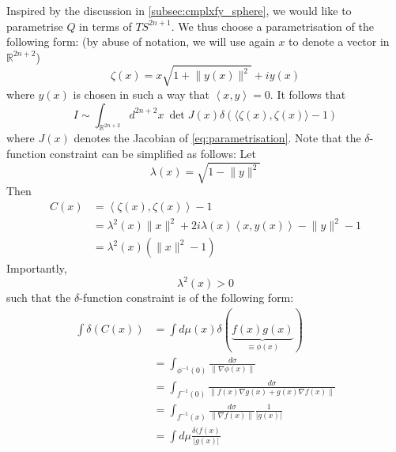 \documentclass[a4paper,11pt]{article}
\theoremstyle{definition}
\newcommand{\RR}{\mathbb{R}}
\begin{document}
Inspired by the discussion in \ref{subsec:cmplxfy_sphere}, we would like to parametrise $Q$ in terms of $TS^{2n + 1}$.
We thus choose a parametrisation of the following form: (by abuse of notation, we will use again $x$ to denote a vector in $\RR^{2n + 2}$)
\begin{equation}
  \zeta(x) = x \sqrt{1 + \lVert y(x) \rVert^2} + i y(x)
  \label{eq:parametrisation}
\end{equation}
where $y(x)$ is chosen in such a way that $\left\langle x,y \right\rangle = 0$.
It follows that 
\begin{equation}
  I \sim \int_{\RR^{2n + 2}} d^{2n + 2}x\ \det J(x) \delta(\langle \zeta(x), \zeta(x) \rangle - 1)
\end{equation}
where $J(x)$ denotes the Jacobian of \eqref{eq:parametrisation}.
Note that the $\delta$-function constraint can be simplified as follows: Let 
\begin{equation}
  \lambda(x) = \sqrt{1 - \lVert y \rVert^2}
\end{equation}
Then 
\begin{equation}
  \begin{split} 
    C(x) &= \left\langle \zeta(x), \zeta(x) \right\rangle  - 1 \\
    &= \lambda^2(x) \lVert x \rVert^2 + 2 i \lambda(x) \left\langle x, y(x) \right\rangle  - \lVert y \rVert^2 - 1\\
    &= \lambda^2(x) (\lVert x \rVert^2 - 1)
  \end{split}
\end{equation}
Importantly, 
\begin{equation}
  \lambda^2(x) > 0 
\end{equation}
such that the $\delta$-function constraint is of the following form:
\begin{equation}
  \begin{split} 
    \int \delta(C(x)) &= \int d\mu(x) \delta(\underbrace{f(x)g(x)}_{\equiv\phi(x)}) \\
    &= \int_{\phi^{-1}(0)}\frac{d\sigma}{\lVert \nabla \phi(x) \rVert} \\
    &= \int_{f^{-1}(0)} \frac{d\sigma}{\lVert f(x) \nabla g(x) + g(x) \nabla f(x) \rVert } \\
    &= \int_{f^{-1}(x)} \frac{d\sigma}{\lVert \nabla f(x) \rVert}\frac{1}{\lvert g(x) \rvert} \\
    &= \int d\mu \frac{\delta(f(x)}{\lvert g(x) \rvert}
  \end{split}
\end{equation}
\end{document}
